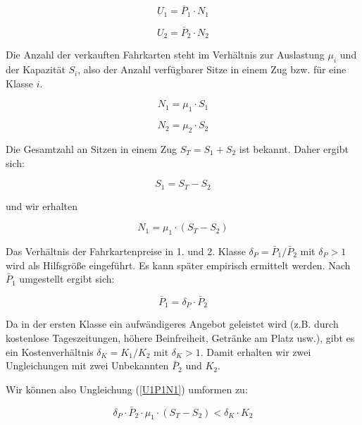 \documentclass[a4paper,12pt]{article}
\begin{document}
\begin{equation}
U_1 = \bar P_1 \cdot N_1
\end{equation}

\begin{equation}
U_2 = \bar P_2 \cdot N_2
\end{equation}

Die Anzahl der verkauften Fahrkarten steht im Verhältnis zur Auslastung $\mu_i$ und der Kapazität $S_i$, also der Anzahl verfügbarer Sitze in einem Zug bzw. für eine Klasse $i$.

\begin{equation}
N_1 = \mu_1 \cdot S_1
\end{equation}

\begin{equation}
N_2 = \mu_2 \cdot S_2
\end{equation}

Die Gesamtzahl an Sitzen in einem Zug $S_T=S_1 + S_2$ ist bekannt. Daher ergibt sich:

\begin{equation}
S_1 = S_T - S_2
\end{equation}

und wir erhalten

\begin{equation}
N_1 = \mu_1 \cdot  (S_T - S_2)
\end{equation}

Das Verhältnis der Fahrkartenpreise in 1. und 2. Klasse $\delta_P=\bar P_1/\bar P_2$ mit $\delta_P > 1$ wird als Hilfsgröße eingeführt. Es kann später empirisch ermittelt werden. Nach $\bar P_1$ umgestellt ergibt sich:
 
\begin{equation}
\bar P_1 = \delta_P \cdot \bar P_2
\end{equation}

Da in der ersten Klasse ein aufwändigeres Angebot geleistet wird (z.B. durch kostenlose Tageszeitungen, höhere Beinfreiheit, Getränke am Platz usw.), gibt es ein Kostenverhältnis $\delta_K = K_1/K_2$ mit $\delta_K>1$. Damit erhalten wir zwei Ungleichungen mit zwei Unbekannten $\bar P_2$ und $K_2$.

Wir können also Ungleichung (\ref{U1P1N1}) umformen zu:

\begin{equation}
\delta_P \cdot \bar P_2 \cdot \mu_1 \cdot  (S_T - S_2) < \delta_K \cdot K_2
\label{U1eingesetzt}
 \end{equation}
 
\end{document}
